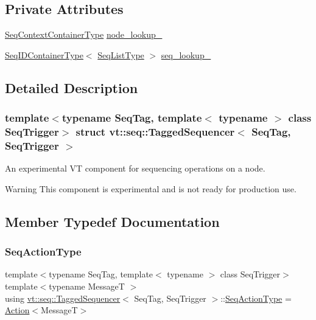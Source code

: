 \subsection*{Private Attributes}
\begin{DoxyCompactItemize}
\item 
\hyperlink{structvt_1_1seq_1_1_tagged_sequencer_ad936050c5f6a8b28457e1056ed5dc57e}{Seq\+Context\+Container\+Type} \hyperlink{structvt_1_1seq_1_1_tagged_sequencer_ac46610c41b21aa98b21b7eb508c39772}{node\+\_\+lookup\+\_\+}
\item 
\hyperlink{structvt_1_1seq_1_1_tagged_sequencer_a718515267468123a9036c30033d74237}{Seq\+I\+D\+Container\+Type}$<$ \hyperlink{structvt_1_1seq_1_1_tagged_sequencer_a8df6e02cdb7c2b38870f7ee7776f6f9c}{Seq\+List\+Type} $>$ \hyperlink{structvt_1_1seq_1_1_tagged_sequencer_ad2216351cd393dbbf256705109961166}{seq\+\_\+lookup\+\_\+}
\end{DoxyCompactItemize}


\subsection{Detailed Description}
\subsubsection*{template$<$typename Seq\+Tag, template$<$ typename $>$ class Seq\+Trigger$>$\newline
struct vt\+::seq\+::\+Tagged\+Sequencer$<$ Seq\+Tag, Seq\+Trigger $>$}

An experimental VT component for sequencing operations on a node. 

\begin{DoxyWarning}{Warning}
This component is experimental and is not ready for production use. 
\end{DoxyWarning}


\subsection{Member Typedef Documentation}
\mbox{\label{structvt_1_1seq_1_1_tagged_sequencer_a0210dbd34288d440e0cd51db9d6637bd}} 
\subsubsection{\texorpdfstring{Seq\+Action\+Type}{SeqActionType}}
{\footnotesize\ttfamily template$<$typename Seq\+Tag, template$<$ typename $>$ class Seq\+Trigger$>$ \\
template$<$typename MessageT $>$ \\
using \hyperlink{structvt_1_1seq_1_1_tagged_sequencer}{vt\+::seq\+::\+Tagged\+Sequencer}$<$ Seq\+Tag, Seq\+Trigger $>$\+::\hyperlink{structvt_1_1seq_1_1_tagged_sequencer_a0210dbd34288d440e0cd51db9d6637bd}{Seq\+Action\+Type} =  \hyperlink{structvt_1_1seq_1_1_action}{Action}$<$MessageT$>$}

